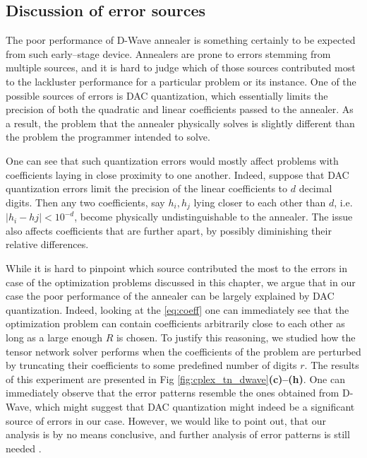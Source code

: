 \subsection{Discussion of error sources}

The poor performance of D-Wave annealer is something certainly to be expected
from such early--stage device. Annealers are prone to errors stemming from
multiple sources, and it is hard to judge which of those sources contributed
most to the lackluster performance for a particular problem or its instance.
One of the possible sources of errors is DAC quantization, which essentially
limits the precision of both the quadratic and linear coefficients passed to
the annealer. As a result, the problem that the annealer physically solves is
slightly different than the problem the programmer intended to solve.

One can see that such quantization errors would mostly affect problems with
coefficients laying in close proximity to one another. Indeed, suppose that DAC
quantization errors limit the precision of the linear coefficients to $d$
decimal digits. Then any two coefficients, say $h_{i}, h_{{j}}$ lying closer to
each other than $d$, i.e. $|h_{i} - h {j}| < 10^{-d}$, become physically
undistinguishable to the annealer. The issue also affects coefficients that are
further apart, by possibly diminishing their relative differences.

While it is hard to pinpoint which source contributed the most to the errors in
case of the optimization problems discussed in this chapter, we argue that in
our case the poor performance of the annealer can be largely explained by DAC
quantization. Indeed, looking at the \eqref{eq:coeff} one can immediately see
that the optimization problem can contain coefficients arbitrarily close to
each other as long as a large enough $R$ is chosen. To justify this reasoning,
we studied how the tensor network solver performs when the coefficients of the
problem are perturbed by truncating their coefficients to some predefined
number of digits $r$. The results of this experiment are presented in Fig
\ref{fig:cplex_tn_dwave}\textbf{(c)--(h)}. One can immediately observe that the
error patterns resemble the ones obtained from D-Wave, which might suggest that
DAC quantization might indeed be a significant source of errors in our case.
However, we would like to point out, that our analysis is by no means
conclusive, and further analysis of error patterns is still needed .

